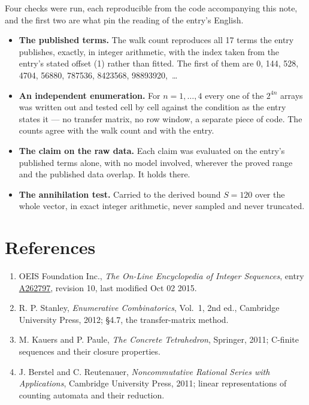 \documentclass[11pt]{article}
\theoremstyle{definition}
\begin{document}
Four checks were run, each reproducible from the code accompanying this note, and the first two are what pin the reading of the entry's English.

\begin{itemize}

\item {\bfseries The published terms.} The walk count reproduces all 17 terms the entry publishes, exactly, in integer arithmetic, with the index taken from the entry's stated offset (1) rather than fitted. The first of them are 0, 144, 528, 4704, 56880, 787536, 8423568, 98893920,~\dots

\item {\bfseries An independent enumeration.} For $n = 1,\dots,4$ every one of the $2^{4n}$ arrays was written out and tested cell by cell against the condition as the entry states it --- no transfer matrix, no row window, a separate piece of code. The counts agree with the walk count and with the entry.

\item {\bfseries The claim on the raw data.} Each claim was evaluated on the entry's published terms alone, with no model involved, wherever the proved range and the published data overlap. It holds there.

\item {\bfseries The annihilation test.} Carried to the derived bound $S = 120$ over the whole vector, in exact integer arithmetic, never sampled and never truncated.

\end{itemize}

\section{References}

\begin{enumerate}

\item OEIS Foundation Inc., \emph{The On-Line Encyclopedia of Integer Sequences}, entry \href{https://oeis.org/A262797}{A262797}, revision 10, last modified Oct 02 2015.

\item R. P. Stanley, \emph{Enumerative Combinatorics}, Vol.~1, 2nd ed., Cambridge University Press, 2012; \S4.7, the transfer-matrix method.

\item M. Kauers and P. Paule, \emph{The Concrete Tetrahedron}, Springer, 2011; C-finite sequences and their closure properties.

\item J. Berstel and C. Reutenauer, \emph{Noncommutative Rational Series with Applications}, Cambridge University Press, 2011; linear representations of counting automata and their reduction.

\end{enumerate}
\end{document}
